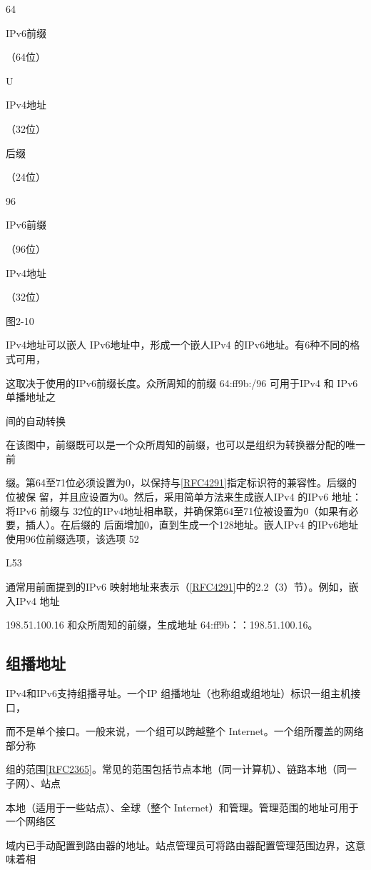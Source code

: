 64

IPv6前缀

（64位）

U

IPv4地址

（32位）

后缀

（24位）

96

IPv6前缀

（96位）

IPv4地址

（32位）

图2-10

IPv4地址可以嵌人 IPv6地址中，形成一个嵌人IPv4 的IPv6地址。有6种不同的格式可用，

这取决于使用的IPv6前缀长度。众所周知的前缀 64:ff9b:/96 可用于IPv4 和 IPv6 单播地址之

间的自动转换

在该图中，前缀既可以是一个众所周知的前缀，也可以是组织为转换器分配的唯一前

缀。第64至71位必须设置为0，以保持与\href{https://www.rfc-editor.org/rfc/rfc4291}{[RFC4291]}指定标识符的兼容性。后缀的位被保
留，并且应设置为0。然后，采用简单方法来生成嵌人IPv4 的IPv6 地址：将IPv6 前缀与
32位的IPv4地址相串联，并确保第64至71位被设置为0（如果有必要，插人）。在后缀的
后面增加0，直到生成一个128地址。嵌人IPv4 的IPv6地址使用96位前缀选项，该选项
52

L53

通常用前面提到的IPv6 映射地址来表示（\href{https://www.rfc-editor.org/rfc/rfc4291}{[RFC4291]}中的2.2（3）节）。例如，嵌入IPv4 地址

198.51.100.16 和众所周知的前缀，生成地址 64:ff9b：：198.51.100.16。

\subsection{组播地址}
IPv4和IPv6支持组播寻址。一个IP 组播地址（也称组或组地址）标识一组主机接口，

而不是单个接口。一般来说，一个组可以跨越整个 Internet。一个组所覆盖的网络部分称

组的范围\href{https://www.rfc-editor.org/rfc/rfc2365}{[RFC2365]}。常见的范围包括节点本地（同一计算机）、链路本地（同一子网）、站点

本地（适用于一些站点）、全球（整个 Internet）和管理。管理范围的地址可用于一个网络区

域内已手动配置到路由器的地址。站点管理员可将路由器配置管理范围边界，这意味着相

